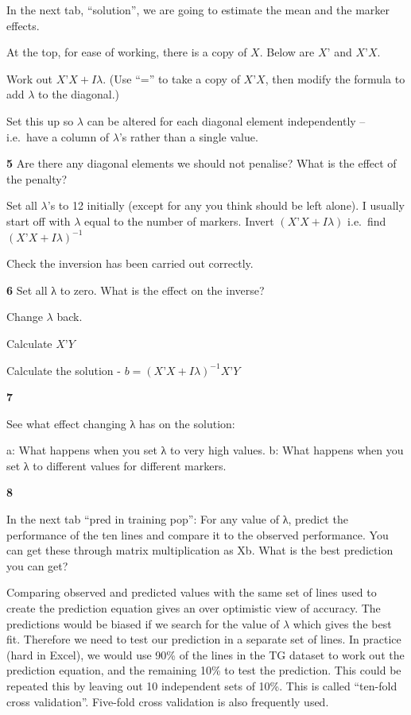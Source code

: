 \documentclass[
]{book}
\makeatletter
\newenvironment{kframe}{%
\medskip{}
\setlength{\fboxsep}{.8em}
 \def\at@end@of@kframe{}%
 \ifinner\ifhmode%
  \def\at@end@of@kframe{\end{minipage}}%
  \begin{minipage}{\columnwidth}%
 \fi\fi%
 \def\FrameCommand##1{\hskip\@totalleftmargin \hskip-\fboxsep
 \colorbox{shadecolor}{##1}\hskip-\fboxsep
     \hskip-\linewidth \hskip-\@totalleftmargin \hskip\columnwidth}%
 \MakeFramed {\advance\hsize-\width
   \@totalleftmargin\z@ \linewidth\hsize
   \@setminipage}}%
 {\par\unskip\endMakeFramed%
 \at@end@of@kframe}
\newenvironment{rmdblock}[1]
  {
  \begin{itemize}
  \renewcommand{\labelitemi}{
    \raisebox{-.7\height}[0pt][0pt]{
      {\setkeys{Gin}{width=3em,keepaspectratio}\texttt{[image: images/\#1]}}
    }
  }
  \setlength{\fboxsep}{1em}
  \begin{kframe}
  \item
  }
  {
  \end{kframe}
  \end{itemize}
  }
\newenvironment{rmdquiz}
  {\begin{rmdblock}{quiz}}
  {\end{rmdblock}}
\makeatother
\begin{document}
In the next tab, ``solution'', we are going to estimate the mean and the marker effects.

At the top, for ease of working, there is a copy of \(X\). Below are \(X’\) and \(X’X\).

Work out \(X’X + Iλ\). (Use ``='' to take a copy of \(X’X\), then modify the formula to add \(λ\) to the diagonal.)

Set this up so \(λ\) can be altered for each diagonal element independently -- i.e.~have a column of \(λ\)'s rather than a single value.

\begin{rmdquiz}
\textbf{5} Are there any diagonal elements we should not penalise? What is the effect of the penalty?
\end{rmdquiz}

Set all \(λ\)'s to 12 initially (except for any you think should be left alone). I usually start off with \(λ\) equal to the number of markers. Invert \((X’X + Iλ)\) i.e.~find \((X’X + Iλ)^{-1}\)

Check the inversion has been carried out correctly.

\begin{rmdquiz}
\textbf{6}
Set all λ to zero. What is the effect on the inverse?
\end{rmdquiz}

Change \(λ\) back.

Calculate \(X’Y\)

Calculate the solution - \(b = (X’X+Iλ)^{-1} X’Y\)

\begin{rmdquiz}
\textbf{7}

See what effect changing λ has on the solution:

a: What happens when you set λ to very high values.
b: What happens when you set λ to different values for different markers.
\end{rmdquiz}

\begin{rmdquiz}
\textbf{8}

In the next tab ``pred in training pop'': For any value of λ, predict the performance of the ten lines and compare it to the observed performance. You can get these through matrix multiplication as Xb. What is the best prediction you can get?
\end{rmdquiz}

Comparing observed and predicted values with the same set of lines used to create the prediction equation gives an over optimistic view of accuracy. The predictions would be biased if we search for the value of \(λ\) which gives the best fit. Therefore we need to test our prediction in a separate set of lines. In practice (hard in Excel), we would use 90\% of the lines in the TG dataset to work out the prediction equation, and the remaining 10\% to test the prediction. This could be repeated this by leaving out 10 independent sets of 10\%. This is called ``ten-fold cross validation''. Five-fold cross validation is also frequently used.
\end{document}
